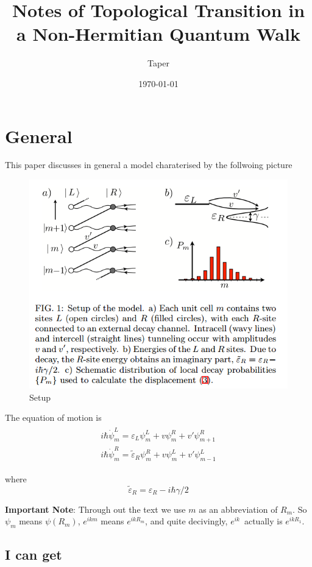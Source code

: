 \documentclass{article}
\title{Notes of Topological Transition in a Non-Hermitian Quantum Walk}
\date{\today}
\author{Taper}
\begin{document}
\maketitle
{}
\tableofcontents
\section{General}
\label{sec:General}

This paper discusses in general a model charaterised by the follwoing
picture
\begin{figure}[H]
    \centering
    \includegraphics[width=0.8\linewidth]{pics/setup.PNG}
    \caption{Setup}
\end{figure}
The equation of motion is
\begin{align}
    \begin{aligned}
        \label{eq:eq-of-motion}
    i\hbar \dot{\psi}^L_m = \varepsilon_L\psi^L_m + v\psi^R_m
    +v'\psi^R_{m+1} \\
    i\hbar \dot{\psi}^R_m = \tilde{\varepsilon}_R\psi^R_m + v\psi^L_m
    +v'\psi^L_{m-1}
    \end{aligned}
\end{align}

where
\begin{equation}
    \tilde\varepsilon_R = \varepsilon_R - i\hbar \gamma/2
\end{equation}

\textbf{Important Note}: Through out the text we use $m$ as an
abbreviation of $R_m$. So $\psi_m$ means $\psi(R_m)$, $e^{ikm}$ means
$e^{ikR_m}$, and quite decivingly, $e^{ik}$~actually is $e^{ikR_1}$.

\subsection{I can get}
\label{sec:I-can-get}
\end{document}
